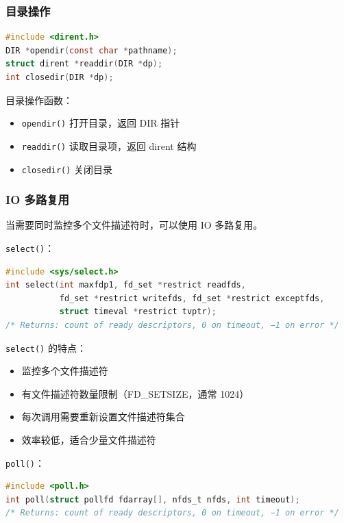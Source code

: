 \subsubsection{目录操作}


\begin{lstlisting}[language=C]
#include <dirent.h>
DIR *opendir(const char *pathname);
struct dirent *readdir(DIR *dp);
int closedir(DIR *dp);
\end{lstlisting}

目录操作函数：
\begin{itemize}
  \item \texttt{opendir()} 打开目录，返回 DIR 指针
  \item \texttt{readdir()} 读取目录项，返回 dirent 结构
  \item \texttt{closedir()} 关闭目录
\end{itemize}

\subsubsection{IO 多路复用}


当需要同时监控多个文件描述符时，可以使用 IO 多路复用。

\texttt{select()}：
\begin{lstlisting}[language=C]
#include <sys/select.h>
int select(int maxfdp1, fd_set *restrict readfds,
           fd_set *restrict writefds, fd_set *restrict exceptfds,
           struct timeval *restrict tvptr);
/* Returns: count of ready descriptors, 0 on timeout, −1 on error */
\end{lstlisting}

\texttt{select()} 的特点：
\begin{itemize}
  \item 监控多个文件描述符
  \item 有文件描述符数量限制（FD\_SETSIZE，通常 1024）
  \item 每次调用需要重新设置文件描述符集合
  \item 效率较低，适合少量文件描述符
\end{itemize}

\texttt{poll()}：
\begin{lstlisting}[language=C]
#include <poll.h>
int poll(struct pollfd fdarray[], nfds_t nfds, int timeout);
/* Returns: count of ready descriptors, 0 on timeout, −1 on error */
\end{lstlisting}

